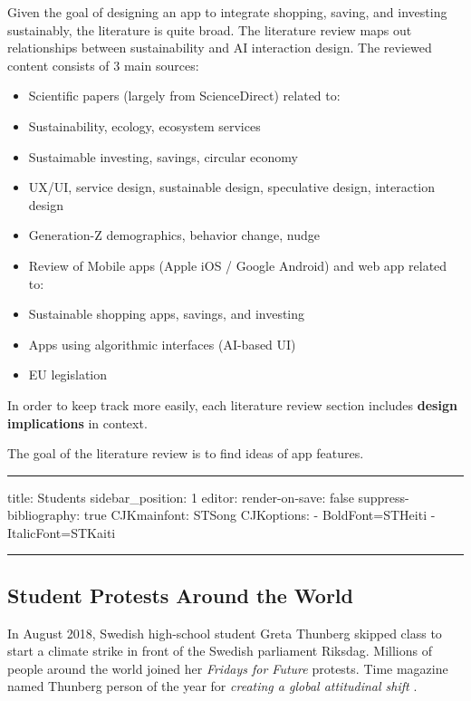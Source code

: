 \documentclass[
  letterpaper,
  DIV=11,
  numbers=noendperiod]{scrartcl}
\begin{document}
Given the goal of designing an app to integrate shopping, saving, and
investing sustainably, the literature is quite broad. The literature
review maps out relationships between sustainability and AI interaction
design. The reviewed content consists of 3 main sources:

\begin{itemize}
\item
  Scientific papers (largely from ScienceDirect) related to:
\item
  Sustainability, ecology, ecosystem services
\item
  Sustaimable investing, savings, circular economy
\item
  UX/UI, service design, sustainable design, speculative design,
  interaction design
\item
  Generation-Z demographics, behavior change, nudge
\item
  Review of Mobile apps (Apple iOS / Google Android) and web app related
  to:
\item
  Sustainable shopping apps, savings, and investing
\item
  Apps using algorithmic interfaces (AI-based UI)
\item
  EU legislation
\end{itemize}

In order to keep track more easily, each literature review section
includes \textbf{design implications} in context.

The goal of the literature review is to find ideas of app features.

\begin{center}\rule{0.5\linewidth}{0.5pt}\end{center}

title: Students sidebar\_position: 1 editor: render-on-save: false
suppress-bibliography: true CJKmainfont: STSong CJKoptions: -
BoldFont=STHeiti - ItalicFont=STKaiti

\begin{center}\rule{0.5\linewidth}{0.5pt}\end{center}

\subsection{Student Protests Around the
World}\label{student-protests-around-the-world}

In August 2018, Swedish high-school student Greta Thunberg skipped class
to start a climate strike in front of the Swedish parliament Riksdag.
Millions of people around the world joined her \emph{Fridays for Future}
protests. Time magazine named Thunberg person of the year for
\emph{creating a global attitudinal shift}
\citep{deutschewelleFridaysFutureGlobal2019}.
\end{document}
